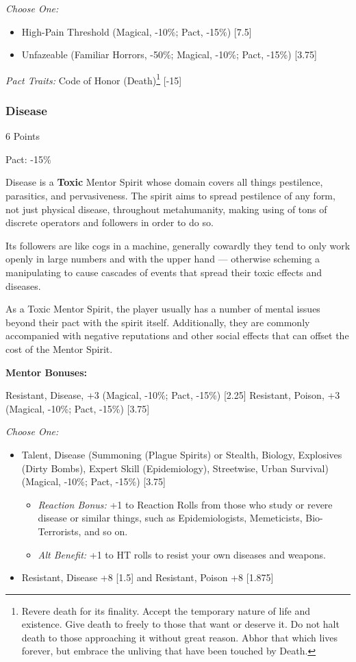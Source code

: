 \begin{multicols}{3}
	\textit{Choose One:}
	\begin{itemize}
		\itemsep 0pt
		\item High-Pain Threshold (Magical, -10\%; Pact, -15\%) [7.5]
		\item Unfazeable (Familiar Horrors, -50\%; Magical, -10\%; Pact, -15\%) [3.75]
	\end{itemize}
	
	\textit{Pact Traits:} Code of Honor (Death)\footnote{Revere death for its finality. Accept the temporary nature of life and existence. Give death to freely to those that want or deserve it. Do not halt death to those approaching it without great reason. Abhor that which lives forever, but embrace the unliving that have been touched by Death.} [-15]
	
	\subsubsection{Disease}
	\begin{flushright}
		6 Points
	\end{flushright}
	Pact: -15\%
	
	Disease is a \textbf{Toxic} Mentor Spirit whose domain covers all things pestilence, parasitics, and pervasiveness. The spirit aims to spread pestilence of any form, not just physical disease, throughout metahumanity, making using of tons of discrete operators and followers in order to do so.
	
	Its followers are like cogs in a machine, generally cowardly they tend to only work openly in large numbers and with the upper hand — otherwise scheming a manipulating to cause cascades of events that spread their toxic effects and diseases.
	
	As a Toxic Mentor Spirit, the player usually has a number of mental issues beyond their pact with the spirit itself. Additionally, they are commonly accompanied with negative reputations and other social effects that can offset the cost of the Mentor Spirit.
	
	\textbf{Mentor Bonuses:} 
	
	Resistant, Disease, +3 (Magical, -10\%; Pact, -15\%) [2.25]
	Resistant, Poison, +3 (Magical, -10\%; Pact, -15\%) [3.75]
	
	\textit{Choose One:}
	\begin{itemize}
		\itemsep 0pt
		\item Talent, Disease (Summoning (Plague Spirits) or Stealth, Biology, Explosives (Dirty Bombs), Expert Skill (Epidemiology), Streetwise, Urban Survival) (Magical, -10\%; Pact, -15\%) [3.75]
		\begin{itemize}
			\itemsep 0pt
			\item \textit{Reaction Bonus:} +1 to Reaction Rolls from those who study or revere disease or similar things, such as Epidemiologists, Memeticists, Bio-Terrorists, and so on.
			\item \textit{Alt Benefit:} +1 to HT rolls to resist your own diseases and weapons.
		\end{itemize}
		\item Resistant, Disease +8 [1.5] and Resistant, Poison +8 [1.875]
	\end{itemize}
	

\end{multicols}
